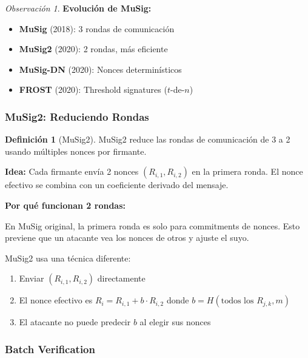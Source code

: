 \documentclass[11pt,a4paper,twoside,openright]{book}
\theoremstyle{definition}
\newtheorem{definition}{Definición}[chapter]
\theoremstyle{plain}
\theoremstyle{remark}
\newtheorem{remark}{Observación}[chapter]
\begin{document}
\begin{remark}
\textbf{Evolución de MuSig:}
\begin{itemize}
    \item \textbf{MuSig} (2018): 3 rondas de comunicación
    \item \textbf{MuSig2} (2020): 2 rondas, más eficiente
    \item \textbf{MuSig-DN} (2020): Nonces determinísticos
    \item \textbf{FROST} (2020): Threshold signatures ($t$-de-$n$)
\end{itemize}
\end{remark}

\subsubsection{MuSig2: Reduciendo Rondas}

\begin{definition}[MuSig2]
MuSig2 reduce las rondas de comunicación de 3 a 2 usando múltiples nonces por firmante.

\textbf{Idea:} Cada firmante envía 2 nonces $(R_{i,1}, R_{i,2})$ en la primera ronda. El nonce efectivo se combina con un coeficiente derivado del mensaje.
\end{definition}

\begin{mathnote}
\textbf{Por qué funcionan 2 rondas:}

En MuSig original, la primera ronda es solo para commitments de nonces. Esto previene que un atacante vea los nonces de otros y ajuste el suyo.

MuSig2 usa una técnica diferente:
\begin{enumerate}
    \item Enviar $(R_{i,1}, R_{i,2})$ directamente
    \item El nonce efectivo es $R_i = R_{i,1} + b \cdot R_{i,2}$ donde $b = H(\text{todos los } R_{j,k}, m)$
    \item El atacante no puede predecir $b$ al elegir sus nonces
\end{enumerate}
\end{mathnote}

\subsubsection{Batch Verification}
\end{document}
